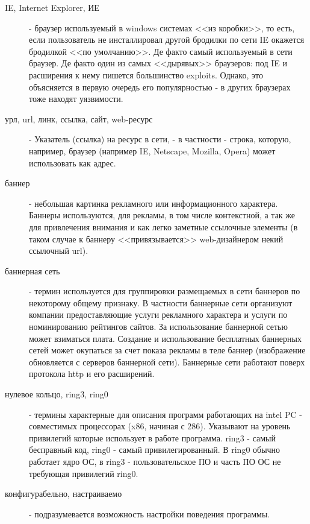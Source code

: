 \begin{description}
\item[IE, Internet Explorer, ИЕ]
 - браузер используемый в windows системах <<из коробки>>, то есть, если пользователь не
 инсталлировал другой бродилки по сети IE окажется бродилкой <<по умолчанию>>. Де факто
 самый используемый в сети браузер. Де факто один из самых <<дырявых>> браузеров: под
IE и расширения к нему пишется большинство exploits. Однако, это объясняется в
первую очередь его популярностью - в других браузерах тоже находят уязвимости.

\item[ урл, url, линк, ссылка, сайт, web-ресурс ]
 - Указатель (ссылка) на ресурс в сети, - в частности - строка, которую, например, браузер (например IE, Netscape, Mozilla, Opera) может использовать как адрес.

\item[баннер]
 - небольшая картинка рекламного или информационного характера. Баннеры используются,
для рекламы, в том числе контекстной, а так же для привлечения внимания и как легко заметные ссылочные элементы (в таком случае к баннеру <<привязывается>> web-дизайнером некий ссылочный url).

\item[баннерная сеть]
 - термин используется для группировки размещаемых в сети баннеров по некоторому общему признаку.
 В частности баннерные сети организуют компании предоставляющие услуги рекламного характера и услуги
 по номинированию рейтингов сайтов. За использование баннерной сетью может взиматься плата. Создание
 и использование бесплатных баннерных сетей может окупаться за счет показа рекламы в теле баннер
(изображение обновляется с серверов баннерной сети). Баннерные сети работают поверх протокола http
 и его расширений.

\item[ нулевое кольцо, ring3, ring0 ]
 - термины характерные для описания программ работающих на intel PC - совместимых процессорах (x86,
 начиная с 286). Указывают на уровень привилегий которые использует в работе программа. ring3 - самый
 бесправный код, ring0 - самый привилегированный. В ring0 обычно работает ядро ОС, в ring3 -
 пользовательское ПО и часть ПО ОС не требующая привилегий ring0.

\item[ конфигурабельно, настраиваемо ]
 - подразумевается возможность настройки поведения программы.


\end{description}
